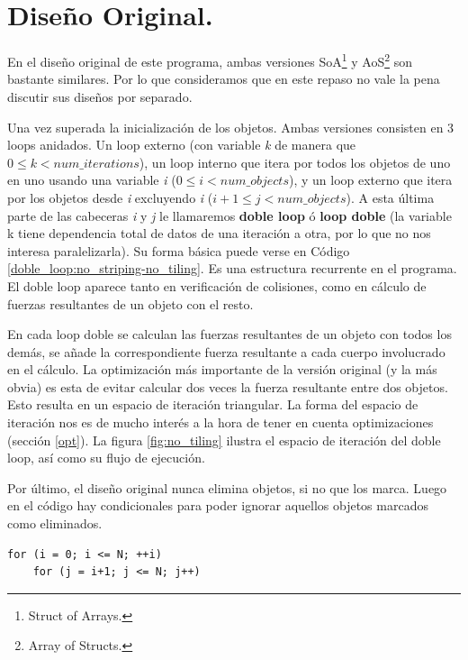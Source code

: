 \documentclass{article}
\begin{document}
\section{Diseño Original.\label{original}}
En el diseño original de este programa, ambas versiones SoA\footnote{Struct of Arrays.} y AoS\footnote{Array of Structs.}
son bastante similares. Por lo que consideramos que en este repaso no vale la pena discutir sus diseños por separado.

Una vez superada la inicialización de los objetos. Ambas versiones consisten en 3 loops anidados.
Un loop externo (con variable \textit{k} de manera que $0\leq{k} < {num\_iterations}$),
un loop interno que itera por todos los objetos de uno en uno usando una variable \textit{i}
($0\leq{i} < {num\_objects}$), y un loop externo que itera por los objetos desde \textit{i}
excluyendo \textit{i} ($i+1\leq{j} < {num\_objects}$). A esta última parte de las cabeceras \textit{i} y \textit{j}
le llamaremos \textbf{doble loop} ó \textbf{loop doble} (la variable k tiene dependencia total de datos de una iteración
a otra, por lo que no nos interesa paralelizarla).
Su forma básica puede verse en Código \ref{doble_loop:no_striping-no_tiling}.
Es una estructura recurrente en el programa. El doble loop aparece tanto en verificación de colisiones, como en cálculo de
fuerzas resultantes de un objeto con el resto.


En cada loop doble se calculan las fuerzas resultantes de un objeto con todos los demás, se añade la
correspondiente fuerza resultante a cada cuerpo involucrado en el cálculo.
La optimización más importante de la
versión original (y la más obvia) es esta de evitar calcular dos veces la fuerza resultante entre
dos objetos. Esto resulta en un espacio de iteración triangular. La forma del espacio de iteración nos es de mucho interés
a la hora de tener en cuenta optimizaciones (sección \ref{opt}). La figura \ref{fig:no_tiling} ilustra
el espacio de iteración del doble loop, así como su flujo de ejecución.


Por último, el diseño original nunca elimina objetos, si no que
los marca. Luego en el código hay condicionales para poder
ignorar aquellos objetos marcados como eliminados.

\newsavebox{\firstlisting}
\begin{lstlisting}[style=CStyle,label=doble_loop:no_striping-no_tiling,caption=doble loop simple.]
for (i = 0; i <= N; ++i)
	for (j = i+1; j <= N; j++)
\end{lstlisting}
\end{document}
